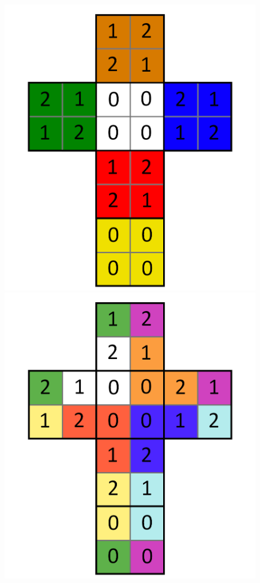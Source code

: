 \documentclass[12pt,a4paper, usenames, dvipsnames]{article}
\begin{document}
\begin{figure}[H]
\centering
\includegraphics[scale=0.1]{foldedout_012.png}
\includegraphics[scale=0.1]{foldedout_c_012.png}
\end{figure}
\end{document}
